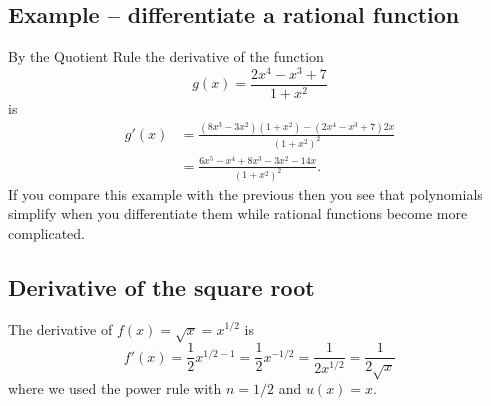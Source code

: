 \subsection{Example -- differentiate a rational function}
By the Quotient Rule the derivative of the function
\[
g(x)=\frac{2x^4-x^3+7}{1+x^2}
\]
is
\begin{align*}
  g'(x)&=\frac{(8x^3-3x^2)(1+x^2)-(2x^4-x^3+7)2x}{(1+x^2)^2}\\
  &=\frac{6x^5-x^4+8x^3-3x^2-14x}{(1+x^2)^2}.
\end{align*}
If you compare this example with the previous then you see
that polynomials simplify when you differentiate them while rational
functions become more complicated.

\subsection{Derivative of the square root}
The derivative of $f(x)=\sqrt{x}=x^{1/2}$ is 
\[
f'(x)
= \frac12 x^{1/2 -1}
= \frac12 x^{-1/2}
= \frac1{2x^{1/2}}=\frac1{2\sqrt x}
\]
where we used the power rule with $n=1/2$ and $u(x)=x$.


